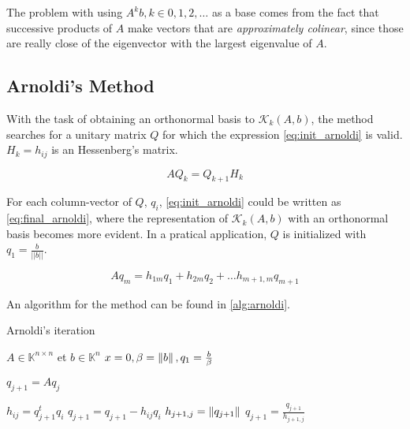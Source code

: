The problem with using ${A^{k}b}, k \in {0,1,2,\dots}$ as a base comes from the fact that successive products of $A$ make vectors that are \textit{approximately colinear}, since those are really close of the eigenvector with the largest eigenvalue of $A$.

\subsection{Arnoldi's Method}

With the task of obtaining an orthonormal basis to $\mathcal{K}_{k}(A,b)$, the method searches for a unitary matrix $Q$ for which the expression \ref{eq:init_arnoldi} is valid. $H_{k}={h_{ij}}$ is an Hessenberg's matrix.


\begin{equation} \label{eq:init_arnoldi}
    AQ_{k} = Q_{k+1}H_{k}
\end{equation}

For each column-vector of $Q$, $q_{i}$, \ref{eq:init_arnoldi} could be written as \ref{eq:final_arnoldi}, where the representation of $\mathcal{K}_{k}(A,b)$ with an orthonormal basis becomes more evident. In a pratical application, $Q$ is initialized with $q_{1} = \frac{b}{||b||}$.

\begin{equation}\label{eq:final_arnoldi}
    Aq_{m} = h_{1m}q_{1} + h_{2m}q_{2} + \dots h_{m+1,m}q_{m+1}
\end{equation}

An algorithm for the method can be found in \ref{alg:arnoldi}.

\begin{algorithm}
    \caption{Arnoldi's iteration}\label{alg:arnoldi}
    \begin{algorithmic}[1]
        \State $A \in \mathbb{K}^{n \times n}$ et $b\in \mathbb{K}^{n}$
        \State $x=0, \beta=\left\lVert b\right\rVert,q_{1}=\frac{b}{\beta}$

        \State $q_{j+1} = Aq_{j}$

        \State $h_{ij}= q_{j+1}^{t}q_{i}$
        \State $q_{j+1} = q_{j+1} - h_{ij}q_{i}$
        \EndFor
        \State $h_{j+1,j}=\left\lVert q_{j+1}\right\rVert$
        \State $q_{j+1} = \frac{q_{j+1}}{h_{j+1,j}}$
        \EndFor

    \end{algorithmic}
\end{algorithm}